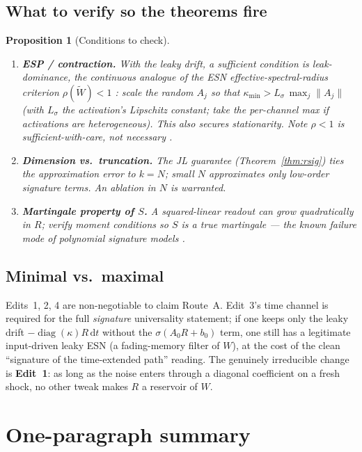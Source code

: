 \documentclass[11pt]{article}
\theoremstyle{definition}
\theoremstyle{plain}
\newtheorem{proposition}{Proposition}[section]
\newcommand{\diag}{\operatorname{diag}}
\newcommand{\dd}{\,\mathrm{d}}
\begin{document}
\subsection{What to verify so the theorems fire}

\begin{proposition}[Conditions to check]
\label{prop:checks}
\leavevmode
\begin{enumerate}[label=(\roman*)]
\item \textbf{ESP / contraction.} With the leaky drift, a sufficient condition is leak-dominance, the continuous analogue of the ESN effective-spectral-radius criterion $\rho(\widetilde W)<1$ \cite{jaeger2007,yildiz2012}: scale the random $A_j$ so that $\kappa_{\min} > L_\sigma\,\max_j\|A_j\|$ (with $L_\sigma$ the activation's Lipschitz constant; take the per-channel max if activations are heterogeneous). This also secures stationarity. Note $\rho<1$ is sufficient-with-care, not necessary \cite{yildiz2012}.
\item \textbf{Dimension vs.\ truncation.} The JL guarantee (Theorem~\ref{thm:rsig}) ties the approximation error to $k=N$; small $N$ approximates only low-order signature terms. An ablation in $N$ is warranted.
\item \textbf{Martingale property of $S$.} A squared-linear readout can grow quadratically in $R$; verify moment conditions so $S$ is a true martingale --- the known failure mode of polynomial signature models \cite{cgms2025}.
\end{enumerate}
\end{proposition}

\subsection{Minimal vs.\ maximal}

Edits~1, 2, 4 are non-negotiable to claim Route~A. Edit~3's time channel is required for the full \emph{signature} universality statement; if one keeps only the leaky drift $-\diag(\kappa)R\dd t$ without the $\sigma(A_0R+b_0)$ term, one still has a legitimate input-driven leaky ESN \cite{jaeger2007} (a fading-memory filter of $W$), at the cost of the clean ``signature of the time-extended path'' reading. The genuinely irreducible change is \textbf{Edit~1}: as long as the noise enters through a diagonal coefficient on a fresh shock, no other tweak makes $R$ a reservoir of $W$.

\section{One-paragraph summary}
\end{document}
